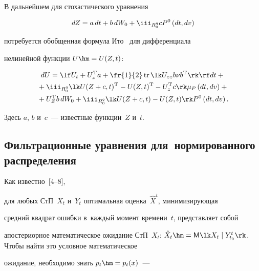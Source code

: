 В дальнейшем для стохастического уравнения

    \begin{equation}

    dZ=a\, dt + b\, dW_0 + \iii_{R_0^q} c P^0\, (dt, dv)\label{e2.5-s1}

    \end{equation}

потребуется обобщенная формула Ито~\cite{5-s1, 8-s1} для дифференциала 

нелинейной функции $U\hm=U(Z,t)$:



\vspace*{-2pt}



\noindent

 \begin{multline}

 dU =\lf U_t + U_z^{\mathrm{T}} a + \fr{1}{2}\,\mathrm{tr}\, \lk U_{zz} b\nu b^{\mathrm{T}}\rk\rf dt +{}\\

 {}+ \iii_{R_0^q} \lk U(Z+c,t)^{\mathrm{T}} - U(Z,t)^{\mathrm{T}} - U_z^{\mathrm{T}} c\rk \mu_P \,(dt, dv)+{}\\

   {}+U_Z^{\mathrm{T}} b\, dW_0 + \iii_{R_0^q} \lk U(Z+c,t) - U(Z,t) \rk P^0 \,(dt, dv)\,.

   \label{e2.6-s1}

   \end{multline}

Здесь $a$, $b$ и~$c$~--- известные функции~$Z$ и~$t$.



\subsection{Фильтрационные уравнения для~нормированного распределения}



Как известно~[4--8], 

для любых СтП~$X_t$ и~$Y_t$ оптимальная оценка~$\hat X^t$, минимизирующая 

средний квадрат ошибки в~каждый момент времени~$t$, представляет собой 

апостериорное математическое ожидание СтП~$X_t$: $\hat X_t \hm= 

{\sf M} \lk X_t \mid Y_{t_0}^t\rk$. Чтобы найти это условное математическое 

ожидание, необходимо знать $p_t \hm= p_t (x)$~--- 

